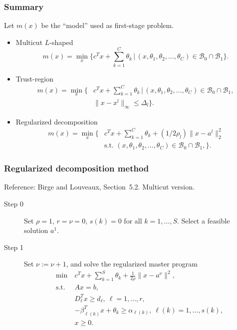 \documentclass{beamer}
\begin{document}
\begin{frame}
\frametitle{Summary}

Let $m(x)$ be the ``model'' used as first-stage problem.
\begin{itemize}
\item
{\red Multicut $L$-shaped}
\[
m(x) = \min_x \Big\lbrace c^Tx + \sum_{k = 1}^C \theta_k \,|\, (x, \theta_1,
\theta_2,\ldots, \theta_C) \in \mathcal{B}_0 \cap \mathcal{B}_1
\Big\rbrace.
\]
\item
{\red Trust-region}
\begin{align*}
m(x)
= \min_x \Big\lbrace &  c^Tx + \sum_{k = 1}^C \theta_k \,|\, (x, \theta_1,
\theta_2,\ldots, \theta_C) \in \mathcal{B}_0 \cap \mathcal{B}_1, \\
& \| x-x^l \|_{\infty} \leq \Delta_l \Big\rbrace.
\end{align*}
\item
{\red Regularized decomposition}
\begin{align*}
m(x) = \min_x \Big\lbrace & c^Tx + \sum_{k = 1}^C \theta_k + (1/2\rho_l)
\| x-a^l \|_2^2 \\ & \mbox{s.t. } (x, \theta_1, \theta_2,\ldots,
\theta_C) \in \mathcal{B}_0 \cap \mathcal{B}_1, \Big\rbrace.
\end{align*}
\end{itemize}

\end{frame}

\begin{frame}
\frametitle{Regularized decomposition method}

{\red Reference: Birge and Louveaux, Section~5.2}. Multicut version.

\begin{description}
\item[Step 0]
Set $\rho = 1$, $r = \nu = 0$, $s(k) = 0$ for all $k = 1,\ldots,S$.
Select a feasible solution $a^1$.
\item[Step 1]
Set $\nu := \nu+1$, and solve the regularized master program
\begin{align*}
\min\ & c^Tx + \sum_{k = 1}^S \theta_k + \frac{1}{2\rho} \| x - a^{\nu}
\|^2,\\
\mbox{s.t. } & Ax = b,\\
& D_{\ell}^Tx \geq d_{\ell},\ \ell = 1,\ldots,r, \\
& -\beta^T_{\ell(k)} x + \theta_k \geq \alpha_{\ell(k)},\ \ell(k) =
1,\ldots,s(k),\\
& x \geq 0.
\end{align*}
\end{description}

\end{frame}
\end{document}
